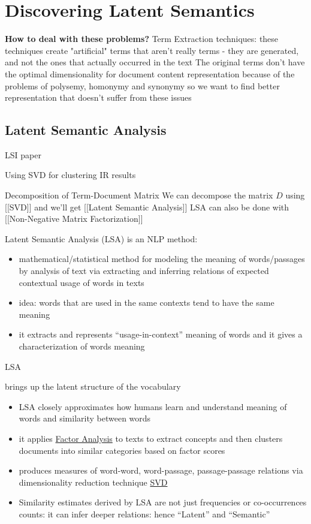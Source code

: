 \section{Discovering Latent Semantics}


\textbf{How to deal with these problems?} Term Extraction techniques:
these techniques create "artificial" terms that aren't really terms - they are generated, and not the ones that actually occurred in the text
The original terms don't have the optimal dimensionality for document content representation
because of the problems of polysemy, homonymy and synonymy
so we want to find better representation that doesn't suffer from these issues


\subsection{Latent Semantic Analysis} \label{sec:lsa}

LSI paper \cite{deerwester1990indexing}

Using SVD for clustering IR results \cite{osinski2004lingo}


 Decomposition of Term-Document Matrix
We can decompose the matrix $D$
using [[SVD]] and we'll get [[Latent Semantic Analysis]]
LSA can also be done with [[Non-Negative Matrix Factorization]]



Latent Semantic Analysis (LSA) is an NLP method:

\begin{itemize}
\itemsep1pt\parskip0pt
\item
  mathematical/statistical method for modeling the meaning of
  words/passages by analysis of text via extracting and inferring
  relations of expected contextual usage of words in texts
\item
  idea: words that are used in the same contexts tend to have the same
  meaning
\item
  it extracts and represents ``usage-in-context'' meaning of words and
  it gives a characterization of words meaning
\end{itemize}

LSA


brings up the latent structure of the vocabulary

\begin{itemize}
\itemsep1pt\parskip0pt
\item
  LSA closely approximates how humans learn and understand meaning of
  words and similarity between words
\item
  it applies \href{Factor Analysis}{Factor Analysis} to texts to extract
  concepts and then clusters documents into similar categories based on
  factor scores
\item
  produces measures of word-word, word-passage, passage-passage
  relations via dimensionality reduction technique \url{SVD}
\item
  Similarity estimates derived by LSA are not just frequencies or
  co-occurrences counts: it can infer deeper relations: hence ``Latent''
  and ``Semantic''
\end{itemize}

